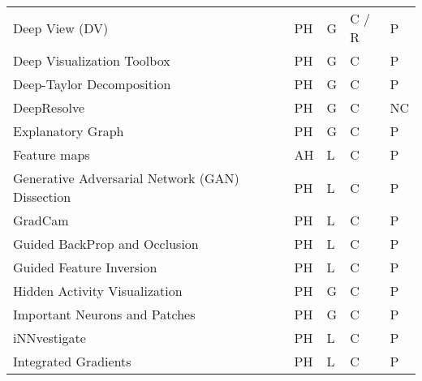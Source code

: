 \documentclass[final,1p,times]{elsarticle}
\begin{document}
\begin{table}[htbp]
\begin{tabular}{m{3.9cm} m{2.7cm} m{0.5cm} m{0.5cm} m{0.5cm} m{0.6cm} m{0.8cm} m{1.05cm}}
    Deep View (DV) &  \citeauthor{zhong2017evolutionary} & \cite{zhong2017evolutionary} & \citeyear{zhong2017evolutionary} & PH & G & C / R & P\\
    Deep Visualization Toolbox & \citeauthor{yosinski2015understanding} & \cite{yosinski2015understanding} &  \citeyear{yosinski2015understanding} & PH & G & C & P\\
    Deep-Taylor Decomposition & \citeauthor{montavon2017explaining} & \cite{montavon2017explaining} & \citeyear{montavon2017explaining} & PH & G & C & P\\
    DeepResolve & \citeauthor{liu2017visualizing} & \cite{liu2017visualizing} & \citeyear{liu2017visualizing} & PH & G & C & NC\\
    Explanatory Graph &  \citeauthor{zhang2018interpreting} &  \cite{zhang2018interpreting} &  \citeyear{zhang2018interpreting} & PH & G & C & P\\
    Feature maps &  \citeauthor{zhang2018interpretable} &  \cite{zhang2018interpretable} &  \citeyear{zhang2018interpretable} & AH & L & C & P\\
    Generative Adversarial Network (GAN) Dissection &  \citeauthor{bau2019gandissect} &  \cite{bau2019gandissect} &  \citeyear{bau2019gandissect} & PH & L & C & P\\
    GradCam &  \citeauthor{selvaraju2017grad} & \cite{selvaraju2017grad} & \citeyear{selvaraju2017grad} & PH & L & C & P\\
    Guided BackProp and Occlusion &  \citeauthor{goyal2016towards} &  \cite{goyal2016towards} &  \citeyear{goyal2016towards} & PH & L & C & P\\
    Guided Feature Inversion &  \citeauthor{du2018towards} &  \cite{du2018towards} &  \citeyear{du2018towards}& PH & L & C & P\\
    Hidden Activity Visualization &  \citeauthor{rauber2017visualizing} &  \cite{rauber2017visualizing} &  \citeyear{rauber2017visualizing} & PH & G & C & P\\
    Important Neurons and Patches & \citeauthor{lengerich2017towards} &  \cite{lengerich2017towards} &  \citeyear{lengerich2017towards} & PH & G & C & P\\
    iNNvestigate &  \citeauthor{alber2019innvestigate} &  \cite{alber2019innvestigate} & \citeyear{alber2019innvestigate} & PH & L & C & P\\
    Integrated Gradients &  \citeauthor{sundararajan2017axiomatic} &  \cite{sundararajan2017axiomatic} &  \citeyear{sundararajan2017axiomatic} & PH & L & C & P\\

\end{tabular}
\end{table}
\end{document}
